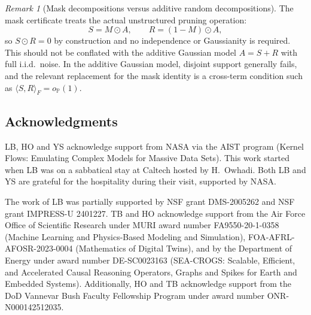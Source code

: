 \documentclass[11pt]{article}
\theoremstyle{plain}
\theoremstyle{definition}
\theoremstyle{remark}
\newtheorem{rem}[thm]{Remark}
\newcommand{\PP}{\mathbb{P}}
\newcommand{\1}{\mathbf{1}}
\begin{document}
\begin{rem}[Mask decompositions versus additive random decompositions]
The mask certificate treats the actual unstructured pruning operation:
\[
S=M\odot A,\qquad R=(1-M)\odot A,
\]
so \(S\odot R=0\) by construction and no independence or Gaussianity is required. This should not be conflated with the additive Gaussian model \(A=S+R\) with full i.i.d.\ noise. In the additive Gaussian model, disjoint support generally fails, and the relevant replacement for the mask identity is a cross-term condition such as \(\langle S,R\rangle_F=o_{\PP}(1)\).
\end{rem}


\subsection*{Acknowledgments}
LB, HO and YS acknowledge support from NASA via the AIST program (Kernel Flows: Emulating Complex Models for Massive Data Sets). This work started when LB was on a sabbatical stay at Caltech hosted by H.\ Owhadi. Both LB and YS are grateful for the hospitality during their visit, supported by NASA.

The work of LB was partially supported by NSF grant DMS-2005262 and NSF grant IMPRESS-U 2401227. TB and HO acknowledge support from the Air Force Office of Scientific Research under MURI award number FA9550-20-1-0358 (Machine Learning and Physics-Based Modeling and Simulation), FOA-AFRL-AFOSR-2023-0004 (Mathematics of Digital Twins), and by the Department of Energy under award number DE-SC0023163 (SEA-CROGS: Scalable, Efficient, and Accelerated Causal Reasoning Operators, Graphs and Spikes for Earth and Embedded Systems). Additionally, HO and TB acknowledge support from the DoD Vannevar Bush Faculty Fellowship Program under award number ONR-N000142512035.

\nocite{kuznedelev2023ovit, chen2021svite, tai2022spartan,
        yang2023nvit, zheng2022savit, zhang2022minivit, fang2024isomorphic,
        rao2021dynamicvit, liang2022evit, yin2022avit, kong2022spvit,
        yu2023xpruner, zhang2024dcvit, sun2025mdp, lu2024alphapruning}




\appendix
\end{document}
